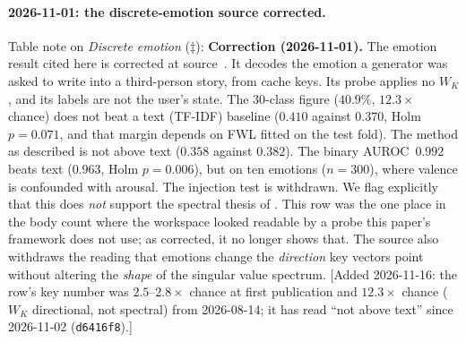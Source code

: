 \documentclass[11pt,a4paper]{article}
\begin{document}
\paragraph{2026-11-01: the discrete-emotion source corrected.}
Table note on \emph{Discrete emotion} ($\ddagger$): \textbf{Correction (2026-11-01).} The emotion result cited here is corrected at
source~\citep{lyra2026usermodel}. It decodes the emotion a generator was
asked to write into a third-person story, from cache keys. Its probe applies
no $W_K$, and its labels are not the user's state. The 30-class figure
($40.9\%$, $12.3\times$ chance) does not beat a text (TF-IDF) baseline
($0.410$ against $0.370$, Holm $p = 0.071$, and that margin depends on FWL
fitted on the test fold). The method as described is not above text
($0.358$ against $0.382$). The binary AUROC~$0.992$ beats text ($0.963$,
Holm $p = 0.006$), but on ten emotions ($n = 300$), where valence is
confounded with arousal. The injection test is withdrawn. We flag
explicitly that this does \emph{not} support the spectral thesis of
. This row was the one place in the body count where the
workspace looked readable by a probe this paper's framework does not use;
as corrected, it no longer shows that. The source also withdraws the reading
that emotions change the \emph{direction} key vectors point without altering
the \emph{shape} of the singular value spectrum.
[Added 2026-11-16: the row's key number was $2.5$--$2.8\times$ chance at
first publication and $12.3\times$ chance ($W_K$ directional, not
spectral) from 2026-08-14; it has read ``not above text'' since
2026-11-02 (\texttt{d6416f8}).]
\end{document}
